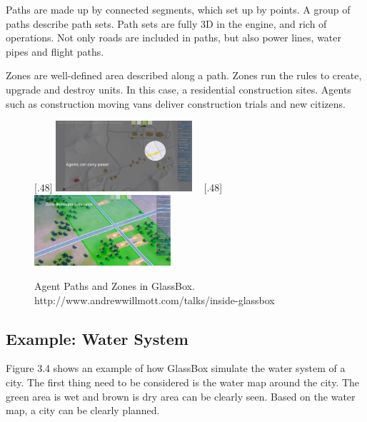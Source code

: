 Paths are made up by connected segments, which set up by points. A group of paths describe path sets. Path sets are fully 3D in the engine, and rich of operations. Not only roads are included in paths, but also power lines, water pipes and flight paths.

Zones are well-defined area described along a path. Zones run the rules to create, upgrade and destroy units. In this case, a residential construction sites. Agents such as construction moving vans deliver construction trials and new citizens.

\begin{figure}[htb]
	\centering	
	[.48\linewidth]{
		\includegraphics[width=0.45\textwidth]{gfx/other_1} 	
	}  	
	~
	[.48\linewidth]{
		\includegraphics[width=0.45\textwidth]{gfx/other_2}  	
	}	  
	
	\caption{Agent Paths and Zones in GlassBox.\\ http://www.andrewwillmott.com/talks/inside-glassbox}
	\label{fig:ex_5}
\end{figure}



\subsection{Example: Water System}

Figure 3.4 shows an example of how GlassBox simulate the water system of a city. The first thing need to be considered is the water map around the city. The green area is wet and brown is dry area can be clearly seen. Based on the water map, a city can be clearly planned. 

